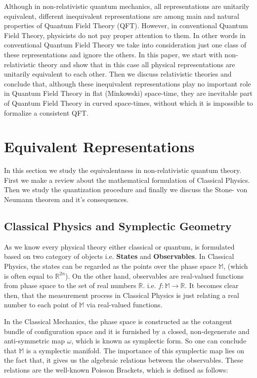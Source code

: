 \documentclass[12pt]{article}
\begin{document}
Although in non-relativistic quantum mechanics, all representations are unitarily equivalent, different inequivalent representations are among main and natural properties of Quantum Field Theory (QFT). However, in conventional Quantum Field Theory, physicists do not pay proper attention to them. In other words in conventional Quantum Field Theory we take into consideration just one class of these representations and ignore the others. In this paper, we start with non-relativistic theory and show that in this case all physical representations are unitarily equivalent to each other. Then we discuss relativistic theories and conclude that, although these inequivalent representations play no important role in Quantum Field Theory in flat (Minkowski) space-time, they are inevitable part of Quantum Field Theory in curved space-times, without which it is impossible to formalize a consistent QFT.
\section{Equivalent Representations}\label{section.UIR}
In this section we study the equivalentness in non-relativistic quantum theory. First we make a review about the mathematical formulation of Classical Physics. Then we study the quantization procedure and finally we discuss the Stone- von Neumann theorem and it's consequences.
\subsection{Classical Physics and Symplectic Geometry}\label{Classical physics}
As we know every physical theory either classical or quantum, is formulated based on two category of objects i.e. \textbf{States} and \textbf{Observables}. In Classical Physics, the states can be regarded as the points over the phase space $\mathbb{M}$, (which is often equal to $\mathbb{R}^{2n}$). On the other hand, observables are real-valued functions from phase space to the set of real numbers $\mathbb{R}$. i.e. $f: \mathbb{M} \rightarrow \mathbb{R}$. It becomes clear then, that the measurement process in Classical Physics is just relating a real number to each point of $\mathbb{M}$ via real-valued functions.

In the Classical Mechanics, the phase space is constructed as the cotangent bundle of configuration space and it is furnished by a closed, non-degenerate and anti-symmetric map $\mathbb{\omega}$, which is known as symplectic form. So one can conclude that $\mathbb{M}$ is a symplectic manifold. The importance of this symplectic map lies on the fact that, it gives us the algebraic relations between the observables. These relations are the well-known Poisson Brackets, which is defined as follows:
\end{document}
